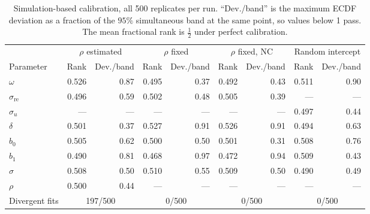 \documentclass[12pt]{article}
\begin{document}
\begin{table}[t]
\centering
\caption{Simulation-based calibration, all 500 replicates per run. ``Dev./band'' is the maximum ECDF deviation as a fraction of the $95\%$ simultaneous band at the same point, so values below 1 pass. The mean fractional rank is $\tfrac{1}{2}$ under perfect calibration.}
\label{tab:sbc}
\begin{tabular}{lrrrrrrrr}
\toprule
& \multicolumn{2}{c}{$\rho$ estimated} & \multicolumn{2}{c}{$\rho$ fixed} & \multicolumn{2}{c}{$\rho$ fixed, NC} & \multicolumn{2}{c}{Random intercept} \\
\cmidrule(lr){2-3}\cmidrule(lr){4-5}\cmidrule(lr){6-7}\cmidrule(lr){8-9}
Parameter & Rank & Dev./band & Rank & Dev./band & Rank & Dev./band & Rank & Dev./band \\
\midrule
$\omega$                 & 0.526 & 0.87 & 0.495 & 0.37 & 0.492 & 0.43 & 0.511 & 0.90 \\
$\sigma_{\mathrm{re}}$   & 0.496 & 0.59 & 0.502 & 0.48 & 0.505 & 0.39 & ---   & ---  \\
$\sigma_u$               & ---   & ---  & ---   & ---  & ---   & ---  & 0.497 & 0.44 \\
$\delta$                 & 0.501 & 0.37 & 0.527 & 0.91 & 0.526 & 0.91 & 0.494 & 0.63 \\
$b_0$                    & 0.505 & 0.62 & 0.500 & 0.50 & 0.501 & 0.31 & 0.508 & 0.76 \\
$b_1$                    & 0.490 & 0.81 & 0.468 & 0.97 & 0.472 & 0.94 & 0.509 & 0.43 \\
$\sigma$                 & 0.508 & 0.50 & 0.510 & 0.55 & 0.509 & 0.50 & 0.490 & 0.49 \\
$\rho$                   & 0.500 & 0.44 & ---   & ---  & ---   & ---  & ---   & ---  \\
\midrule
Divergent fits & \multicolumn{2}{c}{197/500} & \multicolumn{2}{c}{0/500} & \multicolumn{2}{c}{0/500} & \multicolumn{2}{c}{0/500} \\
\bottomrule
\end{tabular}
\end{table}
\end{document}
